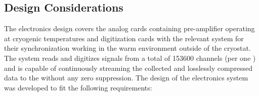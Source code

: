 \subsection{Design Considerations}
\label{sec:fddp-tpc-elec-des-consid}


The  electronics design covers the analog  cards containing pre-amplifier  operating at cryogenic temperatures and digitization cards with the relevant system for their synchronization working in the warm environment outside of the cryostat. The system %
reads and digitizes signals from a total of \num{153600} channels (per one ) and is capable of continuously streaming the collected and losslessly compressed data to the  without any zero suppression. 
The design of the  electronics system was developed to fit the following requirements:
